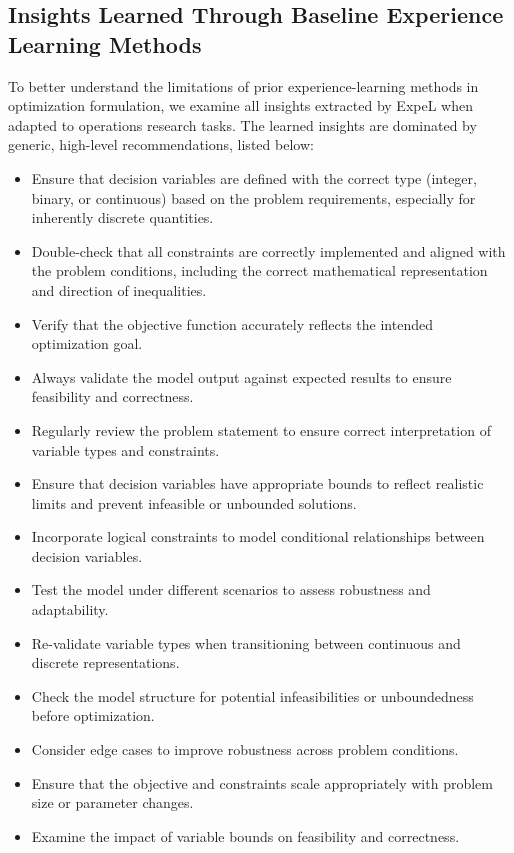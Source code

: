 \documentclass[sigconf, nonacm]{acmart}
\begin{document}
\subsection{Insights Learned Through Baseline Experience Learning Methods\label{appendix:expel_insights}}
To better understand the limitations of prior experience-learning methods in optimization formulation, we examine all insights extracted by ExpeL when adapted to operations research tasks. The learned insights are dominated by generic, high-level recommendations, listed below:
\begin{itemize}
    \item Ensure that decision variables are defined with the correct type (integer, binary, or continuous) based on the problem requirements, especially for inherently discrete quantities.
    \item Double-check that all constraints are correctly implemented and aligned with the problem conditions, including the correct mathematical representation and direction of inequalities.
    \item Verify that the objective function accurately reflects the intended optimization goal.
    \item Always validate the model output against expected results to ensure feasibility and correctness. 
    \item Regularly review the problem statement to ensure correct interpretation of variable types and constraints. 
    \item Ensure that decision variables have appropriate bounds to reflect realistic limits and prevent infeasible or unbounded solutions. 
    \item Incorporate logical constraints to model conditional relationships between decision variables. 
    \item Test the model under different scenarios to assess robustness and adaptability. 
    \item Re-validate variable types when transitioning between continuous and discrete representations. 
    \item Check the model structure for potential infeasibilities or unboundedness before optimization. 
    \item Consider edge cases to improve robustness across problem conditions. 
    \item Ensure that the objective and constraints scale appropriately with problem size or parameter changes. 
    \item Examine the impact of variable bounds on feasibility and correctness. 
\end{itemize}
\end{document}
